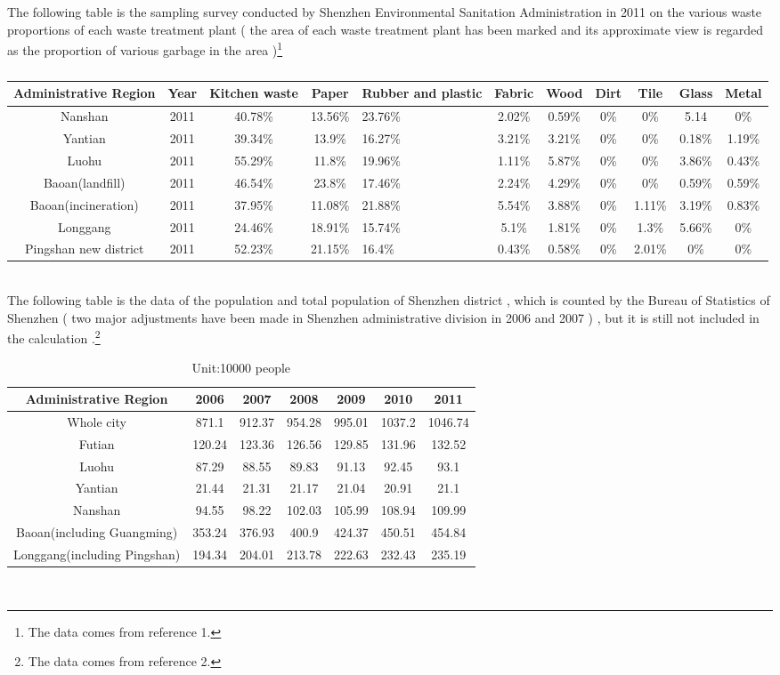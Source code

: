 \documentclass[UTF8]{article}
\begin{document}
\indent The following table is the sampling survey conducted by Shenzhen Environmental Sanitation Administration in 2011 on the various waste proportions of each waste treatment plant ( the area of each waste treatment plant has been marked and its approximate view is regarded as the proportion of various garbage in the area )\footnote{The data comes from reference 1.}
\begin{table}[h]
\begin{center}
\caption{}
\begin{tabular}{ccccp{1cm}
cccccc}
\hline
Administrative Region&Year&Kitchen waste&Paper&Rubber and plastic&Fabric&Wood&Dirt&Tile&Glass&Metal\\
\hline
Nanshan&2011&40.78\%&13.56\%&23.76\%&2.02\%&0.59\%&0\%&0\%&5.14&0\%\\
\hline
Yantian&2011&39.34\%&13.9\%&16.27\%&3.21\%&3.21\%&0\%&0\%&0.18\%&1.19\%\\
\hline
Luohu&2011&55.29\%&11.8\%&19.96\%&1.11\%&5.87\%&0\%&0\%&3.86\%&0.43\%\\
\hline
Baoan(landfill)&2011&46.54\%&23.8\%&17.46\%&2.24\%&4.29\%&0\%&0\%&0.59\%&0.59\%\\
\hline
Baoan(incineration)&2011&37.95\%&11.08\%&21.88\%&5.54\%&3.88\%&0\%&1.11\%&3.19\%&0.83\%\\
\hline
Longgang&2011&24.46\%&18.91\%&15.74\%&5.1\%&1.81\%&0\%&1.3\%&5.66\%&0\%\\
\hline
Pingshan new district&2011&52.23\%&21.15\%&16.4\%&0.43\%&0.58\%&0\%&2.01\%&0\%&0\%\\
\hline
\end{tabular}
\end{center}
\end{table}\\
\indent The following table is the data of the population and total population of Shenzhen district , which is counted by the Bureau of Statistics of Shenzhen ( two major adjustments have been made in Shenzhen administrative division in 2006 and 2007 ) , but it is still not included in the calculation .\footnote{The data comes from reference 2.}
\begin{table}[h]
\caption{Unit:10000 people}
\begin{center}
\begin{tabular}{ccccccc}
\hline
Administrative Region&2006&2007&2008&2009&2010&2011\\
\hline
Whole city&871.1&912.37&954.28&995.01&1037.2&1046.74\\
\hline
Futian&120.24&123.36&126.56&129.85&131.96&132.52\\
\hline
Luohu&87.29&88.55&89.83&91.13&92.45&93.1\\
\hline
Yantian&21.44&21.31&21.17&21.04&20.91&21.1\\
\hline
Nanshan&94.55&98.22&102.03&105.99&108.94&109.99\\
\hline
Baoan(including Guangming)&353.24&376.93&400.9&424.37&450.51&454.84\\
\hline
Longgang(including Pingshan)&194.34&204.01&213.78&222.63&232.43&235.19\\
\hline
\end{tabular}
\end{center}
\end{table}\\
\end{document}
